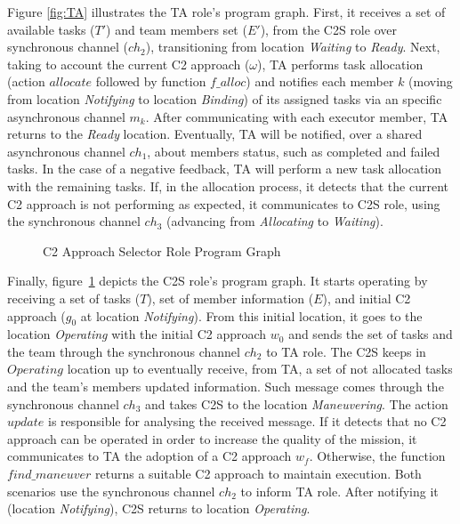 Figure \ref{fig:TA} illustrates the TA role's program graph. First, it receives a set of available tasks ($T'$) and team members set ($E'$), from the C2S role over synchronous channel ($ch_2$), transitioning from location \textit{Waiting} to \textit{Ready}. Next, taking to account the current C2 approach ($\omega$), TA performs task allocation (action $allocate$ followed by function $f\_alloc$) and notifies each member $k$ (moving from location \textit{Notifying} to location \textit{Binding}) of its assigned tasks via an specific asynchronous channel $m_k$. After communicating with each executor member, TA returns to the \textit{Ready} location. Eventually, TA will be notified, over a shared asynchronous channel $ch_1$, about members status, such as completed and failed tasks. In the case of a negative feedback, TA will perform a new task allocation with the remaining tasks. If, in the allocation process, it detects that the current C2 approach is not performing as expected, it communicates to C2S role, using the synchronous channel $ch_3$ (advancing from \textit{Allocating} to \textit{Waiting}).

\begin{figure}[!ht]
    \centering
    \scalebox{.65}{}
    \caption{C2 Approach Selector Role Program Graph}
    \label{fig:C2S}
\end{figure}

Finally, figure~\ref{fig:C2S} depicts the C2S role's program graph. It starts operating by receiving a set of tasks ($T$), set of member information ($E$), and initial C2 approach ($g_0$ at location \textit{Notifying}). From this initial location, it goes to the location \textit{Operating} with the initial C2 approach $w_0$ and sends the set of tasks and the team through the synchronous channel $ch_2$ to TA role. The C2S keeps in $Operating$ location up to eventually receive, from TA, a set of not allocated tasks and the team's members updated information. Such message comes through the synchronous channel $ch_3$ and takes C2S to the location \textit{Maneuvering}. The action $update$ is responsible for analysing the received message. If it detects that no C2 approach can be operated in order to increase the quality of the mission, it communicates to TA the adoption of a C2 approach $w_f$. Otherwise, the function $find\_maneuver$ returns a suitable C2 approach to maintain execution. Both scenarios use the synchronous channel $ch_2$ to inform TA role. After notifying it (location \textit{Notifying}), C2S returns to location \textit{Operating}.


